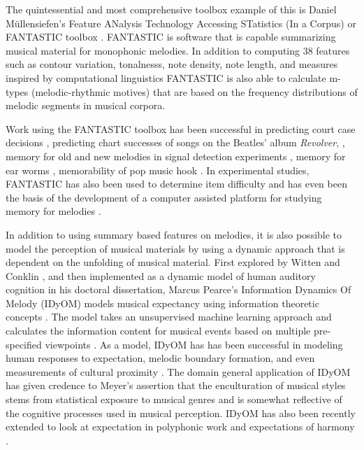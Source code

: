 \documentclass[12pt,]{book}
\begin{document}
The quintessential and most comprehensive toolbox example of this is Daniel Müllensiefen's Feature ANalysis Technology Accessing STatistics (In a Corpus) or FANTASTIC toolbox \citep{mullensiefenFantasticFeatureANalysis2009}.
FANTASTIC is software that is capable summarizing musical material for monophonic melodies.
In addition to computing 38 features such as contour variation, tonalnesss, note density, note length, and measures inspired by computational linguistics \citep{manningFoundationsStatisticalNatural1999} FANTASTIC is also able to calculate m-types (melodic-rhythmic motives) that are based on the frequency distributions of melodic segments in musical corpora.

Work using the FANTASTIC toolbox has been successful in predicting court case decisions \citep{mullensiefenCourtDecisionsMusic2009}, predicting chart successes of songs on the Beatles' album \emph{Revolver}, \citep{kopiezAufSucheNach2011}, memory for old and new melodies in signal detection experiments \citep{mullensiefenRoleFeaturesContext2014}, memory for ear worms \citep{jakubowskiDissectingEarwormMelodic2017, williamsonEarwormsThreeAngles2012}, memorability of pop music hook \citep{balenCorpusAnalyisTools2015}.
In experimental studies, FANTASTIC has also been used to determine item difficulty \citep{bakerPerceptionLeitmotivesRichard2017, harrisonModellingMelodicDiscrimination2016} and has even been the basis of the development of a computer assisted platform for studying memory for melodies \citep{rainsfordMUSOSMUsicSOftware2018}.

In addition to using summary based features on melodies, it is also possible to model the perception of musical materials by using a dynamic approach that is dependent on the unfolding of musical material.
First explored by Witten and Conklin \citep{conklinMultipleViewpointSystems1995}, and then implemented as a dynamic model of human auditory cognition in his doctoral dissertation, Marcus Pearce's Information Dynamics Of Melody (IDyOM) models musical expectancy using information theoretic concepts \citep{shannonMathematicalTheoryCommunication1948}.
The model takes an unsupervised machine learning approach and calculates the information content for musical events based on multiple pre-specified viewpoints \citep{pearceConstructionEvaluationStatistical2005}.
As a model, IDyOM has has been successful in modeling human responses to expectation, melodic boundary formation, and even measurements of cultural proximity \citep{pearceAuditoryExpectationInformation2012, pearceStatisticalLearningProbabilistic2018a}.
The domain general application of IDyOM has given credence to Meyer's assertion that the enculturation of musical styles stems from statistical exposure to musical genres and is somewhat reflective of the cognitive processes used in musical perception.
IDyOM has also been recently extended to look at expectation in polyphonic work \citep{sauvePredictionPolyphonyModelling2017} and expectations of harmony \citep{harrisonDissociatingSensoryCognitive2018}.
\end{document}
